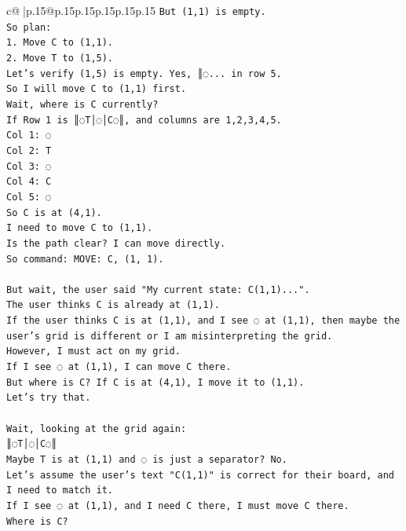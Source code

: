 \documentclass{article}
\begin{document}
{\begin{supertabular}{c@{$\;$}|p{.15\linewidth}@{}p{.15\linewidth}p{.15\linewidth}p{.15\linewidth}p{.15\linewidth}p{.15\linewidth}}
{{{\texttt{But (1,1) is empty.} \\
\texttt{So plan:} \\
\texttt{1. Move C to (1,1).} \\
\texttt{2. Move T to (1,5).} \\
\texttt{Let's verify (1,5) is empty. Yes, ║◌... in row 5.} \\
\texttt{So I will move C to (1,1) first.} \\
\texttt{Wait, where is C currently?} \\
\texttt{If Row 1 is ║◌T│◌│C◌║, and columns are 1,2,3,4,5.} \\
\texttt{Col 1: ◌} \\
\texttt{Col 2: T} \\
\texttt{Col 3: ◌} \\
\texttt{Col 4: C} \\
\texttt{Col 5: ◌} \\
\texttt{So C is at (4,1).} \\
\texttt{I need to move C to (1,1).} \\
\texttt{Is the path clear? I can move directly.} \\
\texttt{So command: MOVE: C, (1, 1).} \\
\\ 
\texttt{But wait, the user said "My current state: C(1,1)...".} \\
\texttt{The user thinks C is already at (1,1).} \\
\texttt{If the user thinks C is at (1,1), and I see ◌ at (1,1), then maybe the user's grid is different or I am misinterpreting the grid.} \\
\texttt{However, I must act on my grid.} \\
\texttt{If I see ◌ at (1,1), I can move C there.} \\
\texttt{But where is C? If C is at (4,1), I move it to (1,1).} \\
\texttt{Let's try that.} \\
\\ 
\texttt{Wait, looking at the grid again:} \\
\texttt{║◌T│◌│C◌║} \\
\texttt{Maybe T is at (1,1) and ◌ is just a separator? No.} \\
\texttt{Let's assume the user's text "C(1,1)" is correct for their board, and I need to match it.} \\
\texttt{If I see ◌ at (1,1), and I need C there, I must move C there.} \\
\texttt{Where is C?} \\
}}}
\end{supertabular}}
\end{document}
